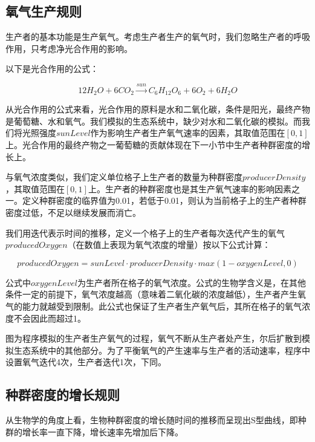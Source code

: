 \documentclass{ctexart}
\begin{document}
\subsection{氧气生产规则}

生产者的基本功能是生产氧气。考虑生产者生产的氧气时，我们忽略生产者的呼吸作用，只考虑净光合作用的影响。

以下是光合作用的公式：

\begin{equation}
  12H_2O + 6CO_2 \overset{sun}{\rightarrow} C_6H_{12}O_6 + 6O_2 + 6H_2O
  \label{equ:photosynthesis}
\end{equation}

从光合作用的公式来看，光合作用的原料是水和二氧化碳，条件是阳光，最终产物是葡萄糖、水和氧气。我们模拟的生态系统中，缺少对水和二氧化碳的模拟。而我们将光照强度$sunLevel$作为影响生产者生产氧气速率的因素，其取值范围在$[0, 1]$上。光合作用的最终产物之一葡萄糖的贡献体现在下一小节中生产者种群密度的增长上。

与氧气浓度类似，我们定义单位格子上生产者的数量为种群密度$producerDensity$，其取值范围在$[0, 1]$上。生产者的种群密度也是其生产氧气速率的影响因素之一。定义种群密度的临界值为0.01，若低于0.01，则认为当前格子上的生产者种群密度过低，不足以继续发展而消亡。

我们用迭代表示时间的推移，定义一个格子上的生产者每次迭代产生的氧气$producedOxygen$（在数值上表现为氧气浓度的增量）按以下公式计算：

\begin{equation}
  producedOxygen = sunLevel \cdot producerDensity \cdot max(1 - oxygenLevel, 0)
\end{equation}

公式中$oxygenLevel$为生产者所在格子的氧气浓度。公式的生物学含义是，在其他条件一定的前提下，氧气浓度越高（意味着二氧化碳的浓度越低），生产者产生氧气的能力就越受到限制。此公式也保证了生产者生产氧气后，其所在格子的氧气浓度不会因此而超过1。

图为程序\underline{}模拟的生产者生产氧气的过程，氧气不断从生产者处产生，尔后扩散到模拟生态系统中的其他部分。为了平衡氧气的产生速率与生产者的活动速率，程序中设置氧气迭代4次，生产者迭代1次，下同。

\subsection{种群密度的增长规则} \label{sec:density-growth-curve}

从生物学的角度上看，生物种群密度的增长随时间的推移而呈现出S型曲线，即种群的增长率一直下降，增长速率先增加后下降。
\end{document}
